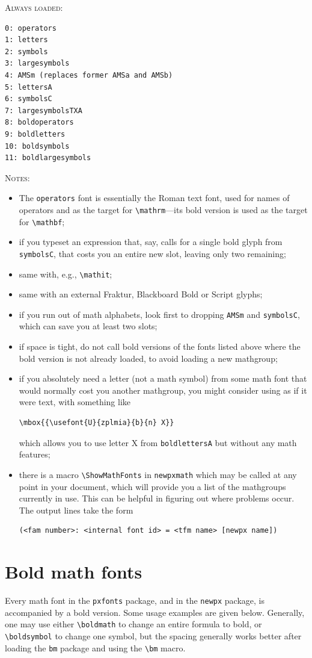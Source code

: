 \documentclass[11pt]{article}
\theoremstyle{oldplain}
\theoremstyle{plain}
\begin{document}
\textsc{Always loaded:}
\begin{verbatim}
0: operators
1: letters
2: symbols
3: largesymbols
4: AMSm (replaces former AMSa and AMSb)
5: lettersA
6: symbolsC
7: largesymbolsTXA
8: boldoperators
9: boldletters
10: boldsymbols
11: boldlargesymbols
\end{verbatim}
\textsc{Notes:}
\begin{itemize}
\item
The {\tt operators} font is essentially the Roman text font, used for names of operators and as the target for \verb|\mathrm|---its bold version is used as the target for \verb|\mathbf|;
\item if you typeset an expression that, say, calls for a single bold glyph from  {\tt symbolsC}, that costs you an entire new slot, leaving only two remaining;
\item same with, e.g., \verb|\mathit|;
\item same with an external Fraktur, Blackboard Bold or Script glyphs;
\item if you run out of math alphabets, look first to dropping {\tt AMSm} and  {\tt symbolsC}, which can save you at least two slots;
\item if space is tight, do not call bold versions of the fonts listed above where the bold version is not already loaded, to avoid loading a new mathgroup; 
\item if you absolutely need a letter (not a math symbol) from some math font that would normally cost you another mathgroup, you might consider using as if it were text, with something like
\begin{verbatim}
\mbox{{\usefont{U}{zplmia}{b}{n} X}}
\end{verbatim}
which allows you to use letter X from {\tt boldlettersA} but without any math features;
\item there is a macro \verb|\ShowMathFonts| in {\tt newpxmath} which may be called at any point in your document, which will provide you a list of the mathgroups currently in use. This can be helpful in figuring out where problems occur. The output lines take the form
\begin{verbatim}
(<fam number>: <internal font id> = <tfm name> [newpx name])
\end{verbatim}

\end{itemize}
\section{Bold math fonts}\label{sec:boldmath}
Every math font in the {\tt pxfonts} package, and in the {\tt newpx} package, is accompanied by a bold version. Some usage examples are given below. Generally, one may use either \verb|\boldmath| to change an entire formula to bold, or \verb|\boldsymbol| to change one symbol, but the spacing generally works better after loading the {\tt bm} package and using the \verb|\bm| macro.
\end{document}
